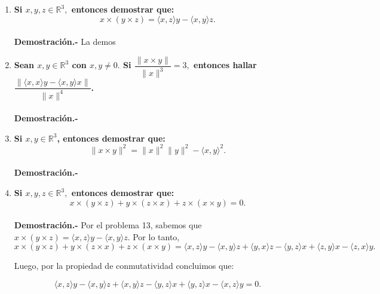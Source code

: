 \begin{enumerate}
    \item \textbf{\boldmath Si $x,y,z \in \mathbb{R}^3,$ entonces demostrar que:
	$$x\times (y \times z) = \langle x,z\rangle y - \langle x,y\rangle z.$$\\
	Demostración.-}\; La demos

    \item \textbf{\boldmath Sean $x,y\in \mathbb{R}^3$ con $x,y\neq 0.$ Si $\dfrac{\|x\times y\|}{\|x\|^3}=3,$ entonces hallar $\dfrac{\| \langle x,x\rangle y - \langle x,y\rangle x \|}{\|x\|^4}$.\\\\
	Demostración.-}\;

    \item \textbf{\boldmath Si $x,y\in \mathbb{R}^3$, entonces demostrar que:
    $$\|x\times y\|^2 = \|x\|^2 \|y\|^2 - \langle x,y \rangle^2.$$\\
	Demostración.-}\;

    \item \textbf{\boldmath Si $x,y,z \in \mathbb{R}^3,$ entonces demostrar que:
    $$x\times (y\times z) + y \times (z\times x)+z\times(x\times y)=0.$$\\
	Demostración.-}\; Por el problema 13, sabemos que $x\times (y \times z) = \langle x,z\rangle y - \langle x,y\rangle z$. Por lo tanto,
	$$x\times (y\times z) + y \times (z\times x)+z\times(x\times y) = \langle x,z\rangle y- \langle x,y\rangle z + \langle y,x\rangle z -\langle y,z \rangle x +\langle z,y\rangle x -\langle z,x\rangle y.$$

	Luego, por la propiedad de conmutatividad concluimos que:

	$$\langle x,z\rangle y- \langle x,y\rangle z + \langle x,y\rangle z -\langle y,z \rangle x +\langle y,z\rangle x -\langle x,z\rangle y = 0.$$\\



\end{enumerate}

